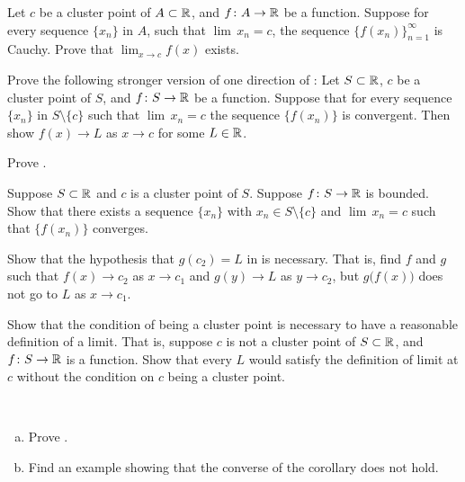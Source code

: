 \begin{exercise}
Let $c$ be a cluster point of $A \subset {\mathbb{R}}$, and $f \colon A \to {\mathbb{R}}$
be a function.  Suppose for every sequence $\{x_n\}$ in $A$,
such that $\lim\, x_n = c$,
the sequence $\{ f(x_n) \}_{n=1}^\infty$ is Cauchy.  Prove that
$\lim_{x\to c} f(x)$ exists.
\end{exercise}

\begin{exercise} \label{exercise:seqflimitalt}
Prove the following stronger version of one direction of
:
Let $S \subset {\mathbb{R}}$, $c$ be a cluster point of $S$, and $f \colon S \to
{\mathbb{R}}$ be a function.
Suppose that for every sequence $\{x_n\}$ in $S \setminus \{c\}$ such that
$\lim\, x_n = c$ the sequence $\{ f(x_n) \}$ is convergent.
Then show $f(x) \to L$ as $x \to c$ for some $L \in {\mathbb{R}}$.
\end{exercise}

\begin{exercise}
Prove .
\end{exercise}

\begin{exercise}
Suppose $S \subset {\mathbb{R}}$ and $c$ is a cluster point of $S$.  Suppose $f \colon
S \to {\mathbb{R}}$ is bounded.  Show that there exists a sequence $\{ x_n \}$
with $x_n \in S \setminus \{ c \}$ and $\lim\, x_n = c$ such that
$\{ f(x_n) \}$ converges.
\end{exercise}

\begin{exercise}[Challenging] \label{exercise:contlimitbadcomposition}
Show that the hypothesis that $g(c_2) = L$ in
 is necessary.  That is, find $f$
and $g$ such that $f(x) \to c_2$ as $x \to c_1$ and
$g(y) \to L$ as $y \to c_2$, but $g\bigl(f(x)\bigr)$ does not go to $L$
as $x \to c_1$.
\end{exercise}

\begin{exercise}
Show that the condition of being a cluster point is necessary to have a
reasonable definition of a limit.  That is, suppose $c$ is not a cluster
point of $S \subset {\mathbb{R}}$, and $f \colon S \to {\mathbb{R}}$ is a function.  Show that
every $L$ would satisfy the definition of limit at $c$ without the condition
on $c$ being a cluster point.
\end{exercise}

\begin{exercise}
{\ }
\begin{enumerate}[a)]
\item
Prove .
\item
Find an example showing that the converse of
the corollary does not hold.
\end{enumerate}
\end{exercise}

